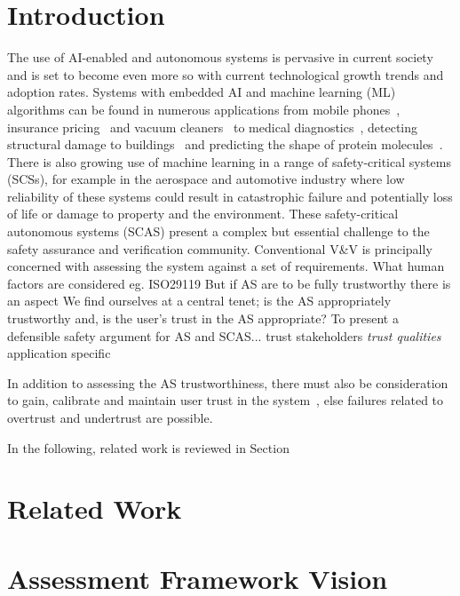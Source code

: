 \section{Introduction}
The use of AI-enabled and autonomous systems is pervasive in current society and is set to become even more so with current technological growth trends and adoption rates. Systems with embedded AI and machine learning (ML) algorithms can be found in numerous applications from mobile phones~\cite{medium_ai_phones}, insurance pricing~\cite{kuo2020towards} and vacuum cleaners~\cite{tf_vacuum} to medical diagnostics~\cite{kononenko2001machine}, detecting structural damage to buildings~\cite{avci2021review} and predicting the shape of protein molecules~\cite{alpha_fold}. 
%
There is also growing use of machine learning in a range of safety-critical systems (SCSs), for example in the aerospace and automotive industry where low reliability of these systems could result in catastrophic failure and potentially loss of life or damage to property and the environment. These safety-critical autonomous systems (SCAS) present a complex but essential challenge to the safety assurance and verification community. 
%
Conventional V\&V is principally concerned with assessing the system against a set of requirements. 
What human factors are considered eg. ISO29119
But if AS are to be fully trustworthy there is an aspect
We find ourselves at a central tenet; is the AS appropriately trustworthy and, is the user's trust in the AS appropriate?
%
To present a defensible safety argument for AS and SCAS...
trust stakeholders
\emph{trust qualities}
application specific

In addition to assessing the AS trustworthiness, there must also be consideration to gain, calibrate and maintain user trust in the system~\cite{kok2020trust, Chiou2021}, else failures related to overtrust and undertrust are possible. 


In the following, related work is reviewed in Section

\section{Related Work}\label{Related_work}


\section{Assessment Framework Vision}\label{Assessment_Framework_Vision}


